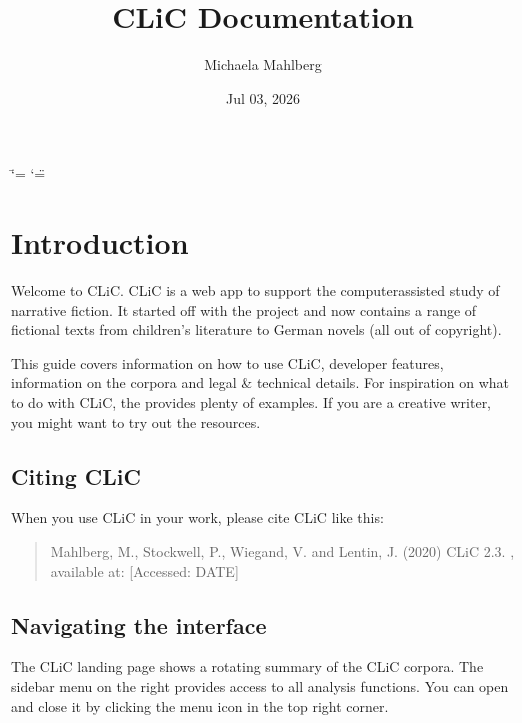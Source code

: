\documentclass[letterpaper,10pt,english]{sphinxmanual}
\title{CLiC Documentation}
\date{Jul 03, 2026}
\author{Michaela Mahlberg}
\begin{document}
\ifdefined\shorthandoff
  \ifnum\catcode`\=\string=\active\shorthandoff{=}\fi
  \ifnum\catcode`\"=\active{}\fi
\fi

\pagestyle{empty}
\sphinxmaketitle
\pagestyle{plain}
\sphinxtableofcontents
\pagestyle{normal}
\label{\detokenize{index::doc}}


\sphinxstepscope


\chapter{Introduction}
\label{\detokenize{introduction:introduction}}\label{\detokenize{introduction::doc}}
\sphinxAtStartPar
Welcome to CLiC. CLiC is a web app to support the computer\sphinxhyphen{}assisted
study of narrative fiction. It started off with the
project and now contains a range of fictional texts from children’s
literature to German novels (all out of copyright).

\sphinxAtStartPar
This guide covers information on how to use CLiC, developer features,
information on the corpora and legal \& technical details. For inspiration
on what to do with CLiC, the
 provides plenty
of examples. If you are a creative writer, you might want to try out the
resources.


\section{Citing CLiC}
\label{\detokenize{introduction:citing-clic}}\label{\detokenize{introduction:id1}}
\sphinxAtStartPar
When you use CLiC in your work, please cite CLiC like this:
\begin{quote}

\sphinxAtStartPar
Mahlberg, M., Stockwell, P., Wiegand, V. and Lentin, J. (2020)
CLiC 2.3. , available at:
 {[}Accessed: DATE{]}
\end{quote}


\section{Navigating the interface}
\label{\detokenize{introduction:navigating-the-interface}}\label{\detokenize{introduction:id2}}
\sphinxAtStartPar
The CLiC landing page shows a rotating summary of the CLiC corpora.
The sidebar menu on the right provides access to all analysis functions.
You can open and close it by clicking the menu icon in the top right
corner.
\end{document}
